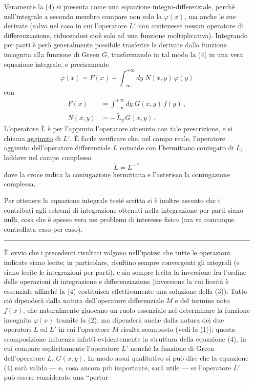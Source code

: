 \documentclass[11pt, a4paper]{book}
\numberwithin{equation}{section}
\begin{document}
Veramente la (4) si presenta come una \uline{equazione integro-differenziale}, perché nell'integrale a secondo membro compare non solo la $\varphi(x)$, ma anche le sue derivate (salvo nel caso in cui l'operatore $L'$ non contenesse nessun operatore di differenziazione, riducendosi cioè solo ad una funzione moltiplicativa). Integrando per parti è però generalmente possibile trasferire le derivate dalla funzione incognita alla funzione di Green $G$, trasformando in tal modo la (4) in una vera equazione integrale, e precisamente
\begin{equation*}
\varphi(x) = F(x) + \int_{-\infty}^{+\infty} dy\; N(x,y)\,\varphi(y)
\end{equation*}
con
\begin{align*}
F(x) &= \int_{-\infty}^{+\infty} dy\; G(x,y)\,f(y)\,, \\
N(x,y) &= -\,\widetilde{L}_y\,G(x,y)\,.
\end{align*}
L'operatore $\widetilde{L}$ è per l'appunto l'operatore ottenuto con tale prescrizione, e si chiama \uline{aggiunto} di $L'$. È facile verificare che, nel campo reale, l'operatore aggiunto dell'operatore differenziale $L$ coincide con l'hermitiano coniugato di $L$, laddove nel campo complesso
\begin{equation*}
\widetilde{L} = L^{+*}
\end{equation*}
dove la croce indica la coniugazione hermitiana e l'asterisco la coniugazione complessa.

Per ottenere la equazione integrale testé scritta si è inoltre assunto che i contributi agli estremi di integrazione ottenuti nella integrazione per parti siano nulli, cosa che è spesso vera nei problemi di interesse fisico (ma va comunque controllata caso per caso).

\noindent\rule{\linewidth}{0.4pt}

È ovvio che i precedenti risultati valgono nell'ipotesi che tutte le operazioni indicate siano lecite; in particolare, risultino sempre convergenti gli integrali (e siano lecite le integrazioni per parti), e sia sempre lecita la inversione fra l'ordine delle operazioni di integrazione e differenziazione (inversione la cui liceità è essenziale affinché la (4) costituisca effettivamente una soluzione della (3)). Tutto ciò dipenderà dalla natura dell'operatore differenziale $M$ e del termine noto $f(x)$, che naturalmente giuocano un ruolo essenziale nel determinare la funzione incognita $\varphi(x)$ tramite la (2); ma dipenderà anche dalla natura dei due operatori $L$ ed $L'$ in cui l'operatore $M$ risulta scomposto (vedi la (1)); questa scomposizione influenza infatti evidentemente la struttura della equazione (4), in cui compare esplicitamente l'operatore $L'$ nonché la funzione di Green dell'operatore $L$, $G(x,y)$. In modo assai qualitativo si può dire che la equazione (4) sarà valida --- e, cosa ancora più importante, sarà utile --- se l'operatore $L'$ può essere considerato una ``pertur-
\end{document}
